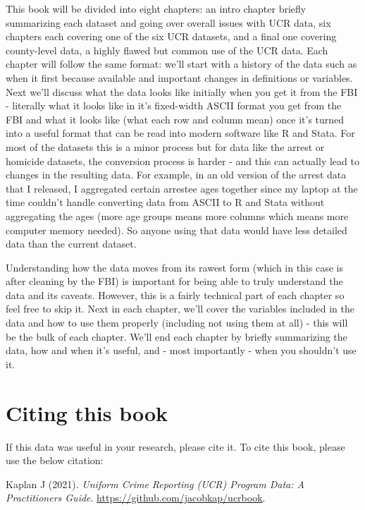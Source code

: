 \documentclass[
  12pt,
]{book}
\begin{document}
This book will be divided into eight chapters: an intro chapter briefly summarizing each dataset and going over overall issues with UCR data, six chapters each covering one of the six UCR datasets, and a final one covering county-level data, a highly flawed but common use of the UCR data. Each chapter will follow the same format: we'll start with a history of the data such as when it first because available and important changes in definitions or variables. Next we'll discuss what the data looks like initially when you get it from the FBI - literally what it looks like in it's fixed-width ASCII format you get from the FBI and what it looks like (what each row and column mean) once it's turned into a useful format that can be read into modern software like R and Stata. For most of the datasets this is a minor process but for data like the arrest or homicide datasets, the conversion process is harder - and this can actually lead to changes in the resulting data. For example, in an old version of the arrest data that I released, I aggregated certain arrestee ages together since my laptop at the time couldn't handle converting data from ASCII to R and Stata without aggregating the ages (more age groups means more columns which means more computer memory needed). So anyone using that data would have less detailed data than the current dataset.

Understanding how the data moves from its rawest form (which in this case is after cleaning by the FBI) is important for being able to truly understand the data and its caveats. However, this is a fairly technical part of each chapter so feel free to skip it. Next in each chapter, we'll cover the variables included in the data and how to use them properly (including not using them at all) - this will be the bulk of each chapter. We'll end each chapter by briefly summarizing the data, how and when it's useful, and - most importantly - when you shouldn't use it.

\hypertarget{citing-this-book}{%
\section*{Citing this book}\label{citing-this-book}}

If this data was useful in your research, please cite it. To cite this book, please use the below citation:

Kaplan J (2021). \emph{Uniform Crime Reporting (UCR) Program Data: A Practitioners Guide}. \url{https://github.com/jacobkap/ucrbook}.
\end{document}
